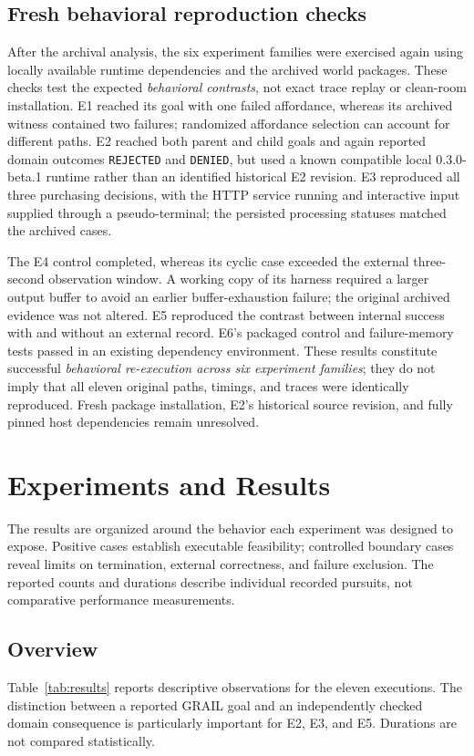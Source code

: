 \documentclass[11pt]{article}
\begin{document}
\subsection{Fresh behavioral reproduction checks}
After the archival analysis, the six experiment families were exercised again using locally available runtime dependencies and the archived world packages. These checks test the expected \emph{behavioral contrasts}, not exact trace replay or clean-room installation. E1 reached its goal with one failed affordance, whereas its archived witness contained two failures; randomized affordance selection can account for different paths. E2 reached both parent and child goals and again reported domain outcomes \texttt{REJECTED} and \texttt{DENIED}, but used a known compatible local 0.3.0-beta.1 runtime rather than an identified historical E2 revision. E3 reproduced all three purchasing decisions, with the HTTP service running and interactive input supplied through a pseudo-terminal; the persisted processing statuses matched the archived cases.

The E4 control completed, whereas its cyclic case exceeded the external three-second observation window. A working copy of its harness required a larger output buffer to avoid an earlier buffer-exhaustion failure; the original archived evidence was not altered. E5 reproduced the contrast between internal success with and without an external record. E6's packaged control and failure-memory tests passed in an existing dependency environment. These results constitute successful \emph{behavioral re-execution across six experiment families}; they do not imply that all eleven original paths, timings, and traces were identically reproduced. Fresh package installation, E2's historical source revision, and fully pinned host dependencies remain unresolved.

\section{Experiments and Results}
The results are organized around the behavior each experiment was designed to expose. Positive cases establish executable feasibility; controlled boundary cases reveal limits on termination, external correctness, and failure exclusion. The reported counts and durations describe individual recorded pursuits, not comparative performance measurements.

\subsection{Overview}
Table~\ref{tab:results} reports descriptive observations for the eleven executions. The distinction between a reported GRAIL goal and an independently checked domain consequence is particularly important for E2, E3, and E5. Durations are not compared statistically.
\end{document}
